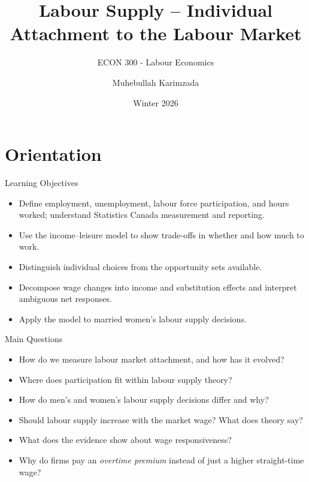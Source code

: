 \documentclass[aspectratio=169]{beamer}
\title{\textbf{Labour Supply -- Individual Attachment to the Labour Market \vspace{.5cm}\\  }}
\subtitle{ {\large ECON 300 - Labour Economics}}
\author{Muhebullah Karimzada}
\date{Winter 2026}
\begin{document}
\begin{frame}[plain]
  \titlepage
\end{frame}

\section{Orientation}

\begin{frame}{Learning Objectives}
\transfade
\begin{itemize}
  \item Define employment, unemployment, labour force participation, and hours worked; understand Statistics Canada measurement and reporting.
  \item Use the income–leisure model to show trade-offs in whether and how much to work.
  \item Distinguish individual choices from the opportunity sets available.
  \item Decompose wage changes into income and substitution effects and interpret ambiguous net responses.
  \item Apply the model to married women’s labour supply decisions.
\end{itemize}

\end{frame}

\begin{frame}{Main Questions}
\transfade
\begin{itemize}
  \item How do we measure labour market attachment, and how has it evolved?
  \item Where does participation fit within labour supply theory?
  \item How do men’s and women’s labour supply decisions differ and why?
  \item Should labour supply increase with the market wage? What does theory say?
  \item What does the evidence show about wage responsiveness?
  \item Why do firms pay an \textit{overtime premium} instead of just a higher straight-time wage?
\end{itemize}

\end{frame}
\end{document}
